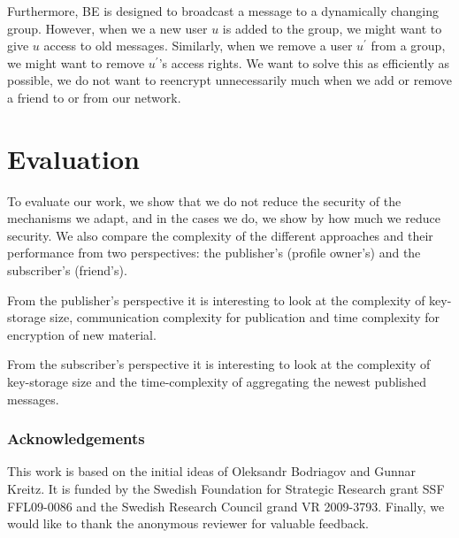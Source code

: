 Furthermore, \ac{BE} is designed to broadcast a message to a dynamically 
changing group.
However, when we a new user \(u\) is added to the group, we might want to give 
\(u\) access to old messages.
Similarly, when we remove a user \(u^\prime\) from a group, we might want to 
remove \(u^\prime\)'s access rights.
We want to solve this as efficiently as possible, we do not want to reencrypt 
unnecessarily much when we add or remove a friend to or from our network.




\section{Evaluation}\label{sec:Evaluation}

To evaluate our work, we show that we do not reduce the security of the 
mechanisms we adapt, and in the cases we do, we show by how much we reduce 
security.
We also compare the complexity of the different approaches and their 
performance from two perspectives: the publisher's (profile owner's) and the 
subscriber's (friend's).

From the publisher's perspective it is interesting to look at the complexity of 
key-storage size, communication complexity for publication and time complexity 
for encryption of new material.

From the subscriber's perspective it is interesting to look at the complexity 
of key-storage size and the time-complexity of aggregating the newest published 
messages.


\subsubsection{Acknowledgements}

This work is based on the initial ideas of Oleksandr Bodriagov and Gunnar 
Kreitz.
It is funded by the Swedish Foundation for Strategic Research grant SSF 
FFL09-0086 and the Swedish Research Council grand VR 2009-3793.
Finally, we would like to thank the anonymous reviewer for valuable feedback.


\printbibliography
